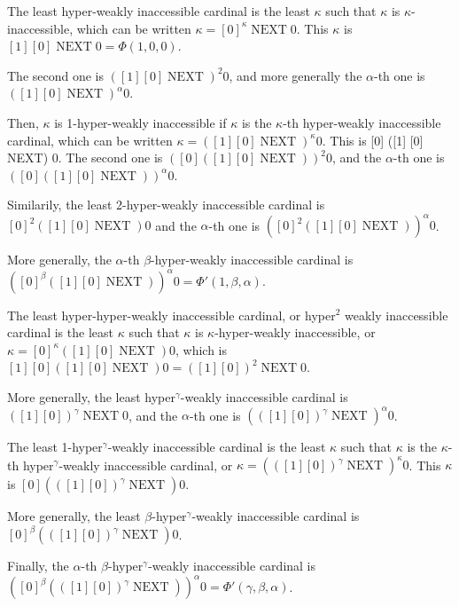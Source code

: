 \documentclass[10pt]{article}
\begin{document}
The least hyper-weakly inaccessible cardinal is the least \( \kappa \) such that \( \kappa \) is \(\kappa\)-inaccessible, which can be written \( \kappa = [0]^\kappa \operatorname{NEXT} 0 \). This \( \kappa \) is \( [1] [0] \operatorname{NEXT} 0 = \Phi(1,0,0) \).

The second one is \( ([1] [0] \operatorname{NEXT})^2 0 \), and more generally the \(\alpha\)-th one is \( ([1] [0] \operatorname{NEXT})^\alpha 0 \).

Then, \( \kappa \) is 1-hyper-weakly inaccessible if \( \kappa \) is the \(\kappa\)-th hyper-weakly inaccessible cardinal, which can be written \( \kappa = ([1] [0] \operatorname{NEXT})^\kappa 0 \). This is [0] ([1] [0] NEXT) 0. The second one is \( ([0] ([1] [0] \operatorname{NEXT}))^2 0 \), and the \(\alpha\)-th one is \( ([0] ([1] [0] \operatorname{NEXT}))^\alpha 0 \).

Similarily, the least 2-hyper-weakly inaccessible cardinal is \( [0]^2 ([1] [0] \operatorname{NEXT}) 0 \) and the \(\alpha\)-th one is \( ([0]^2 ([1] [0] \operatorname{NEXT}))^\alpha 0 \).

More generally, the \(\alpha\)-th \(\beta\)-hyper-weakly inaccessible cardinal is \( ([0]^\beta ([1] [0] \operatorname{NEXT}))^\alpha 0 = \Phi'(1,\beta,\alpha) \).

The least hyper-hyper-weakly inaccessible cardinal, or hyper\(^2\) weakly inaccessible cardinal is the least \( \kappa \) such that \( \kappa \) is \(\kappa\)-hyper-weakly inaccessible, or \( \kappa = [0]^\kappa ([1]  [0] \operatorname{NEXT}) 0 \), which is  \( [1] [0] ([1] [0] \operatorname{NEXT}) 0  = ([1] [0])^2 \operatorname{NEXT} 0 \).

More generally, the least hyper\(^\gamma\)-weakly inaccessible cardinal is \( ([1] [0])^\gamma \operatorname{NEXT} 0 \), and the \(\alpha\)-th one is \( (([1] [0])^\gamma \operatorname{NEXT})^\alpha 0 \).

The least 1-hyper\(^\gamma\)-weakly inaccessible cardinal is the least \( \kappa \) such that \( \kappa \) is the \(\kappa\)-th hyper\(^\gamma\)-weakly inaccessible cardinal, or \( \kappa = (([1] [0])^\gamma \operatorname{NEXT})^\kappa 0 \). This \( \kappa \) is \( [0] (([1] [0])^\gamma \operatorname{NEXT}) 0 \).

More generally, the least \(\beta\)-hyper\(^\gamma\)-weakly inaccessible cardinal is \( [0]^\beta (([1] [0])^\gamma \operatorname{NEXT}) 0 \).

Finally, the \(\alpha\)-th \(\beta\)-hyper\(^\gamma\)-weakly inaccessible cardinal is \( ([0]^\beta (([1] [0])^\gamma \operatorname{NEXT}))^\alpha 0 = \Phi'(\gamma,\beta,\alpha) \).
\end{document}
